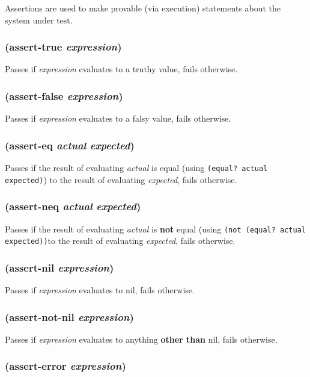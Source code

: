 \documentclass{article}
\begin{document}
Assertions are used to make provable (via execution) statements about the system under test.

\subsubsection{(assert-true \emph{expression})}

Passes if \emph{expression} evaluates to a truthy value, fails otherwise.

\subsubsection{(assert-false \emph{expression})}

Passes if \emph{expression} evaluates to a falsy value, fails otherwise.

\subsubsection{(assert-eq \emph{actual} \emph{expected})}

Passes if the result of evaluating \emph{actual} is equal (using
\verb|(equal? actual expected)|) to the result of evaluating \emph{expected}, fails otherwise.

\subsubsection{(assert-neq \emph{actual} \emph{expected})}

Passes if the result of evaluating \emph{actual} is \textbf{not} equal (using
\verb|(not (equal? actual expected))|to the result of evaluating \emph{expected}, fails
otherwise.

\subsubsection{(assert-nil \emph{expression})}

Passes if \emph{expression} evaluates to nil, fails otherwise.

\subsubsection{(assert-not-nil \emph{expression})}

Passes if \emph{expression} evaluates to anything \textbf{other than} nil, fails otherwise.

\subsubsection{(assert-error \emph{expression})}
\end{document}
